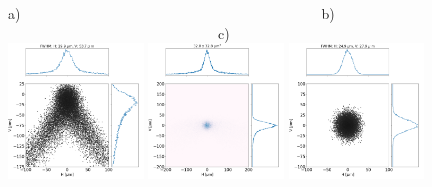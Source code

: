 \documentclass{iucr}              %
\begin{document}
\begin{figure}\label{fig:als}
\flushleft
a)~~~~~~~~~~~~~~~~~~~~~~~~~~~~~~~~~~~~~~~~~~~b)~~~~~~~~~~~~~~~~~~~~~~~~~~~~~~~~~~~~~~~~~~~c)\\
\centering
\includegraphics[width=0.32\textwidth]{figures/als_toroid.png}
\includegraphics[width=0.32\textwidth]{figures/als_parabolic-cone.png}
\includegraphics[width=0.32\textwidth]{figures/als_diaboloid.png}


\end{figure}
\end{document}
